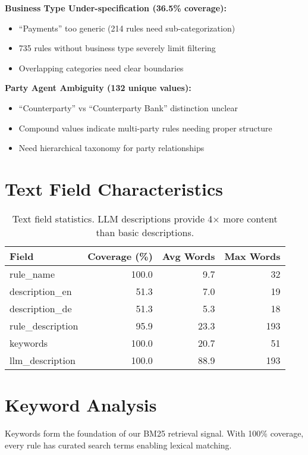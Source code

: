 \textbf{Business Type Under-specification (36.5\% coverage):}
\begin{itemize}[leftmargin=*,itemsep=2pt,topsep=2pt]
 \item ``Payments'' too generic (214 rules need sub-categorization)
 \item 735 rules without business type severely limit filtering
 \item Overlapping categories need clear boundaries
\end{itemize}

\textbf{Party Agent Ambiguity (132 unique values):}
\begin{itemize}[leftmargin=*,itemsep=2pt,topsep=2pt]
 \item ``Counterparty'' vs ``Counterparty Bank'' distinction unclear
 \item Compound values indicate multi-party rules needing proper structure
 \item Need hierarchical taxonomy for party relationships
\end{itemize}

\section{Text Field Characteristics}

\begin{table}[ht]
\centering
\begin{tabular}{lrrr}
\toprule
\textbf{Field} & \textbf{Coverage (\%)} & \textbf{Avg Words} & \textbf{Max Words} \\
\midrule
rule\_name & 100.0 & 9.7 & 32 \\
description\_en & 51.3 & 7.0 & 19 \\
description\_de & 51.3 & 5.3 & 18 \\
rule\_description & 95.9 & 23.3 & 193 \\
keywords & 100.0 & 20.7 & 51 \\
llm\_description & 100.0 & 88.9 & 193 \\
\bottomrule
\end{tabular}
\caption{Text field statistics. LLM descriptions provide 4× more content than basic descriptions.}
\label{tab:text-stats}
\end{table}

\section{Keyword Analysis}

Keywords form the foundation of our BM25 retrieval signal. With 100\% coverage, every rule has curated search terms enabling lexical matching.

